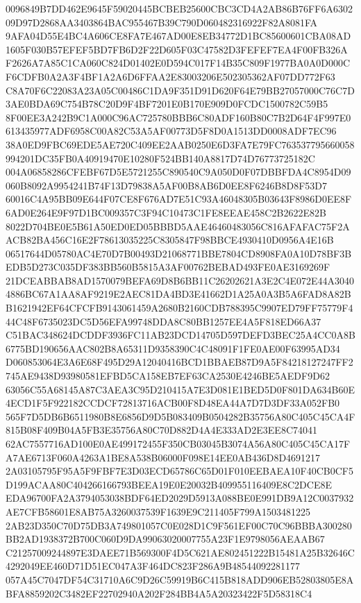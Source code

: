 \documentclass[UTF8,fontset=fandol,zihao=-4,a4paper]{ctexart}
\begin{document}
{{0096849B7DD462E9645F59020445BCBEB25600CBC3CD4A2AB86B76FF6A630209D97D2868AA3403864BAC955467B39C790D060482316922F82A8081FA
9AFA04D55E4BC4A606CE8FA7E467AD00E8EB34772D1BC85600601CBA08AD1605F030B57EFEF5BD7FB6D2F22D605F03C47582D3FEFEF7EA4F00FB326A
F2626A7A85C1CA060C824D01402E0D594C017F14B35C809F1977BA0A0D000CF6CDFB0A2A3F4BF1A2A6D6FFAA2E83003206E502305362AF07DD772F63
C8A70F6C22083A23A05C00486C1DA9F351D91D620F64E79BB27057000C76C7D3AE0BDA69C754B78C20D9F4BF7201E0B170E909D0FCDC1500782C59B5
8F00EE3A242B9C1A000C96AC725780BBB6C80ADF160B80C7B2D64F4F997E0613435977ADF6958C00A82C53A5AF00773D5F8D0A1513DD0008ADF7EC96
38A0ED9FBC69EDE5AE720C409EE2AAB0250E6D3FA7E79FC763537795660058994201DC35FB0A40919470E10280F524BB140A8817D74D76773725182C
004A06858286CFEBF67D5E5721255C890540C9A050D0F07DBBFDA4C8954D09060B8092A9954241B74F13D79838A5AF00B8AB6D0EE8F6246B8D8F53D7
60016C4A95BB09E644F07CE8F676AD7E51C93A46048305B03643F8986D0EE8F6AD0E264E9F97D1BC009357C3F94C10473C1FE8EEAE458C2B2622E82B
8022D704BE0E5B61A50ED0ED05BBBD5AAE46460483056C816AFAFAC75F2AACB82BA456C16E2F78613035225C8305847F98BBCE4930410D0956A4E16B
06517644D05780AC4E70D7B00493D21068771BBE7804CD8908FA0A10D78BF3BEDB5D273C035DF383BB560B5815A3AF00762BEBAD493FE0AE3169269F
21DCEABBAB8AD1570079BEFA69D8B6BB11C26202621A3E2C4E072E44A30404886BC67A1AA8AF9219E2AEC81DA4BD3E41662D1A25A0A3B5A6FAD8A82B
B1621942EF64CFCFB9143061459A2680B2160CDB788395C9907ED79FF75779F444C48F6735023DC5D56EFA99748DDA8C80BB1257EE4A5F818ED66A37
C51BAC348624DCDDF3936FC11AB23DCD14705D597DEFD3BEC25A4CC0A8B6775BD190656AAC802B8A65311D9358390C4C48091F1FE0AE00F63995AD34
D060853064E3A6E68F495D29A12040416BCD1BBAEB87D9A5F84218127247FF2745AE9438D93980581EFBD5CA158EB7EF63CA2530E4246BE5AEDF9D62
63056C55A68145A87C3AEA3C95D210415A7E3D081E1BED5D0F801DA634B60E4ECD1F5F922182CCDCF72813716ACB00F8D48EA44A7D7D3DF33A052FB0
565F7D5DB6B6511980B8E6856D9D5B083409B0504282B35756A80C405C45CA4F815B08F409B04A5FB3E35756A80C70D882D4A4E333AD2E3EE8C74041
62AC7557716AD100E0AE499172455F350CB03045B3074A56A80C405C45CA17FA7AE6713F060A4263A1BE8A538B06000F098E14EE0AB436D8D4691217
2A03105795F95A5F9FBF7E3D03ECD65786C65D01F010EEBAEA10F40CB0CF5D199ACAA80C404266166793BEEA19E0E20032B409955116409E8C2DCE8E
EDA96700FA2A3794053038BDF64ED2029D5913A088BE0E991DB9A12C0037932AE7CFB58601E8AB75A3260037539F1639E9C211405F799A1503481225
2AB23D350C70D75DB3A749801057C0E028D1C9F561EF00C70C96BBBA300280BB2AD1938372B700C060D9DA99063020007755A23F1E9798056AEAAB67
C21257009244897E3DAEE71B569300F4D5C621AE802451222B15481A25B32646C4292049EE460D71D51EC047A3F464DC823F286A9B48544092281177
057A45C7047DF54C31710A6C9D26C59919B6C415B818ADD906EB52803805E8ABFA8859202C3482EF22702940A202F284BB4A5A20323422F5D58318C4
}}
\end{document}

